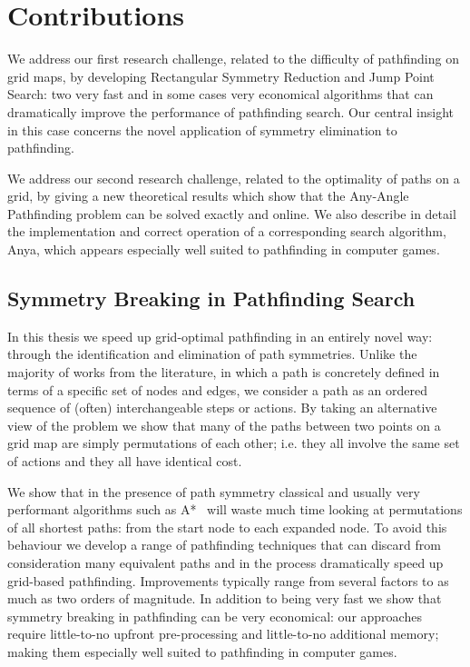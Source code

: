 \section{Contributions}
\label{cha::intro::contributions}
We address our first research challenge, related to the difficulty of
pathfinding on grid maps, by developing Rectangular Symmetry Reduction and
Jump Point Search: two very fast and in some cases very economical algorithms
that can dramatically improve the performance of pathfinding search.  Our
central insight in this case concerns the novel application of symmetry
elimination to pathfinding.

We address our second research challenge, related to the optimality of paths
on a grid, by giving a new theoretical results which show that the Any-Angle
Pathfinding problem can be solved exactly and online. We also describe in
detail the implementation and correct operation of a corresponding search
algorithm, Anya, which appears especially well suited to pathfinding in
computer games.

\subsection{Symmetry Breaking in Pathfinding Search}
In this thesis we speed up grid-optimal pathfinding in an entirely novel way:
through the identification and elimination of path symmetries.  Unlike the
majority of works from the literature, in which a path is concretely defined
in terms of a specific set of nodes and edges, we consider a path as an
ordered sequence of (often) interchangeable steps or actions.
By taking an alternative view of the problem we show that many of the paths
between two points on a grid map are simply permutations of each other; i.e.
they all involve the same set of actions and they all have identical cost.

We show that in the presence of path symmetry classical and usually very
performant algorithms such as A{*}~\citep{hart68} will waste much time looking at
permutations of all shortest paths: from the start node to each expanded node.
To avoid this behaviour we develop a range of pathfinding techniques that can
discard from consideration many equivalent paths and in the process
dramatically speed up grid-based pathfinding.  Improvements typically range from 
several factors to as much as two orders of magnitude.  In addition
to being very fast we show that symmetry breaking in pathfinding can be very
economical: our approaches require little-to-no upfront pre-processing and
little-to-no additional memory; making them especially well suited to
pathfinding in computer games.


